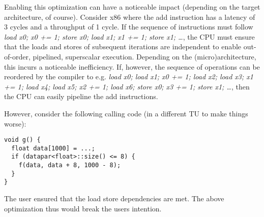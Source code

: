 Enabling this optimization can have a noticeable impact (depending on the target architecture, of course).
Consider x86 where the \float add instruction has a latency of 3 cycles and a throughput of 1 cycle.
If the sequence of instructions must follow \textit{load x0; x0 += 1; store x0; load x1; x1 += 1; store x1; \ldots}, the CPU must ensure that the loads and stores of subsequent iterations are independent to enable out-of-order, pipelined, superscalar execution.
Depending on the (micro)architecture, this incurs a noticeable inefficiency.
If, however, the sequence of operations can be reordered by the compiler to e.g. \textit{load x0; load x1; x0 += 1; load x2; load x3; x1 += 1; load x4; load x5; x2 += 1; load x6; store x0; x3 += 1; store x1; \dots}, then the CPU can easily pipeline the add instructions.

However, consider the following calling code (in a different TU to make things worse):
\smallskip \begin{lstlisting}[style=Vc]
void g() {
  float data[1000] = ...;
  if (datapar<float>::size() <= 8) {
    f(data, data + 8, 1000 - 8);
  }
}
\end{lstlisting}
The user ensured that the load store dependencies are met.
The above optimization thus would break the users intention.

